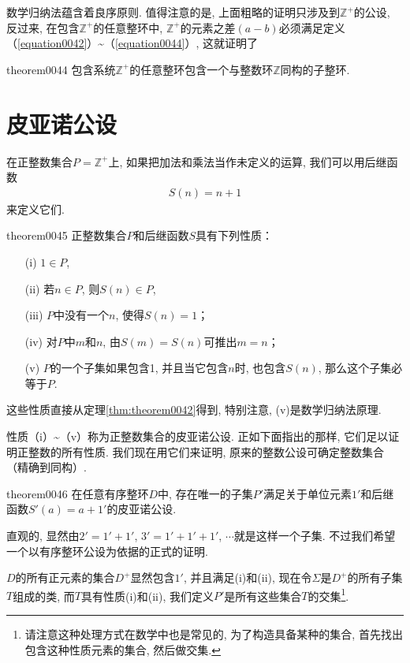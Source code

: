 数学归纳法蕴含着良序原则. 值得注意的是, 上面粗略的证明只涉及到$\mathbb{Z}^+$的公设, 反过来, 在包含$\mathbb{Z}^+$的任意整环中, $\mathbb{Z}^+$的元素之差$(a-b)$必须满足定义（\ref{equation0042}）\textasciitilde（\ref{equation0044}）, 这就证明了
\begin{theorem}{}{theorem0044}
包含系统$\mathbb{Z}^+$的任意整环包含一个与整数环$\mathbb{Z}$同构的子整环. 
\end{theorem}


\section{皮亚诺公设}\label{subsection0010206}
在正整数集合$P=\mathbb{Z}^+$上, 如果把加法和乘法当作未定义的运算, 我们可以用后继函数
\begin{gather}\label{equation0045}
S(n)=n+1
\end{gather}
来定义它们. 

\begin{theorem}{}{theorem0045}
正整数集合$P$和后继函数$S$具有下列性质：
\begin{enumerate}
\item[(i)] $1 \in P$, 
\item[(ii)] 若$n \in P$, 则$S(n) \in P$, 
\item[(iii)] $P$中没有一个$n$, 使得$S(n)=1$；
\item[(iv)] 对$P$中$m$和$n$, 由$S(m)=S(n)$可推出$m=n$；
\item[(v)] $P$的一个子集如果包含1, 并且当它包含$n$时, 也包含$S(n)$, 那么这个子集必等于$P$. 
\end{enumerate}
\end{theorem}

这些性质直接从定理\ref{thm:theorem0042}得到, 特别注意, (v)是数学归纳法原理. 

性质（i）\textasciitilde（v）称为正整数集合的皮亚诺公设. 正如下面指出的那样, 它们足以证明正整数的所有性质. 我们现在用它们来证明, 原来的整数公设可确定整数集合（精确到同构）. 

\begin{theorem}{}{theorem0046}
在任意有序整环$D$中, 存在唯一的子集$P'$满足关于单位元素$1'$和后继函数$S'(a)=a+1'$的皮亚诺公设. 
\end{theorem}

直观的, 显然由$2'=1'+1'$, $3'=1'+1'+1'$, $\cdots$就是这样一个子集. 不过我们希望一个以有序整环公设为依据的正式的证明. 

$D$的所有正元素的集合$D^+$显然包含$1'$, 并且满足(i)和(ii), 现在令$\Sigma$是$D^+$的所有子集$T$组成的类, 而$T$具有性质(i)和(ii), 我们定义$P'$是所有这些集合$T$的交集\footnote{请注意这种处理方式在数学中也是常见的, 为了构造具备某种的集合, 首先找出包含这种性质元素的集合, 然后做交集. }. 


